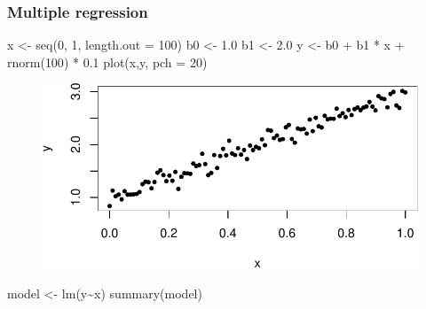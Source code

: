 \documentclass[
  letterpaper,
  DIV=11,
  numbers=noendperiod]{scrartcl}
\newenvironment{Shaded}{\begin{snugshade}}{\end{snugshade}}
\newcommand{\AttributeTok}[1]{\textcolor[rgb]{0.40,0.45,0.13}{#1}}
\newcommand{\DecValTok}[1]{\textcolor[rgb]{0.68,0.00,0.00}{#1}}
\newcommand{\FloatTok}[1]{\textcolor[rgb]{0.68,0.00,0.00}{#1}}
\newcommand{\FunctionTok}[1]{\textcolor[rgb]{0.28,0.35,0.67}{#1}}
\newcommand{\NormalTok}[1]{\textcolor[rgb]{0.00,0.23,0.31}{#1}}
\newcommand{\OtherTok}[1]{\textcolor[rgb]{0.00,0.23,0.31}{#1}}
\newcommand{\SpecialCharTok}[1]{\textcolor[rgb]{0.37,0.37,0.37}{#1}}
\begin{document}
\hypertarget{multiple-regression-1}{%
\subsubsection{Multiple regression}\label{multiple-regression-1}}

\begin{Shaded}
\begin{Highlighting}[]
\NormalTok{x }\OtherTok{\textless{}{-}} \FunctionTok{seq}\NormalTok{(}\DecValTok{0}\NormalTok{, }\DecValTok{1}\NormalTok{, }\AttributeTok{length.out =} \DecValTok{100}\NormalTok{)}
\NormalTok{b0 }\OtherTok{\textless{}{-}} \FloatTok{1.0}
\NormalTok{b1 }\OtherTok{\textless{}{-}} \FloatTok{2.0}
\NormalTok{y }\OtherTok{\textless{}{-}}\NormalTok{ b0 }\SpecialCharTok{+}\NormalTok{ b1 }\SpecialCharTok{*}\NormalTok{ x }\SpecialCharTok{+} \FunctionTok{rnorm}\NormalTok{(}\DecValTok{100}\NormalTok{) }\SpecialCharTok{*} \FloatTok{0.1}
\FunctionTok{plot}\NormalTok{(x,y, }\AttributeTok{pch =} \DecValTok{20}\NormalTok{)}
\end{Highlighting}
\end{Shaded}

\begin{figure}[H]

{\centering \includegraphics{index_files/figure-pdf/unnamed-chunk-17-1.pdf}

}

\end{figure}

\begin{Shaded}
\begin{Highlighting}[]
\NormalTok{model }\OtherTok{\textless{}{-}} \FunctionTok{lm}\NormalTok{(y}\SpecialCharTok{\textasciitilde{}}\NormalTok{x)}
\FunctionTok{summary}\NormalTok{(model)}
\end{Highlighting}
\end{Shaded}
\end{document}
